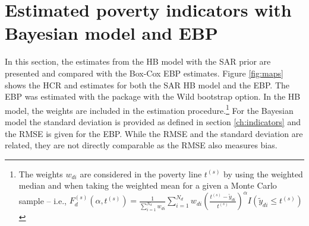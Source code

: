 \section{Estimated poverty indicators with Bayesian model and EBP}
In this section, the estimates from the HB model with the SAR prior are presented and compared with the Box-Cox EBP estimates.
Figure \ref{fig:maps} shows the HCR and estimates for both the SAR HB model and the EBP.
The EBP was estimated with the  \citep{kreutzmann_r_2019} package with the Wild bootstrap option.
In the HB model, the weights are included in the estimation procedure.\footnote{The weights $w_{di}$ are considered in the poverty line $t^{(s)}$ by using the weighted median and when taking the weighted mean for a given a Monte Carlo sample – i.e., $F^{(s)}_d(\alpha, t^{(s)}) = \frac 1 {\sum_{i=1}^{N_d} w_{di}} \sum_{i=1}^{N_d} w_{di}\left( \frac{t^{(s)} - \tilde y_{di}}{t^{(s)}} \right)^\alpha I (\tilde y_{di} \le t^{(s)})$}
For the Bayesian model the standard deviation is provided as defined in section \ref{ch:indicators} and the RMSE is given for the EBP.
While the RMSE and the standard deviation are related, they are not directly comparable as the RMSE also measures bias.


